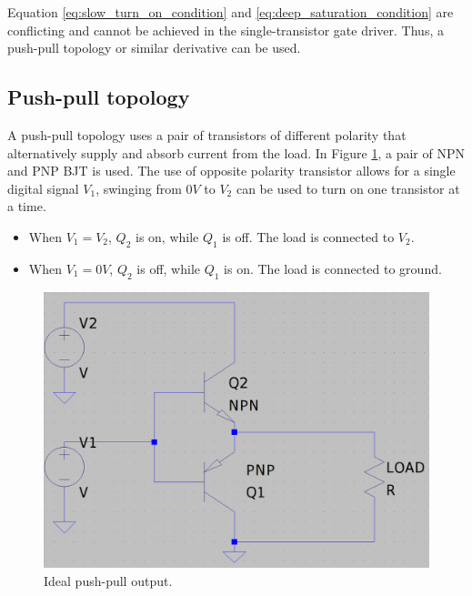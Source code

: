 \documentclass[../main.tex]{subfiles}
\begin{document}
    \justify
    Equation \eqref{eq:slow_turn_on_condition} and \eqref{eq:deep_saturation_condition} are conflicting and cannot be achieved in the single-transistor gate driver. Thus, a push-pull topology or similar derivative can be used.

    \pagebreak
    \subsection{Push-pull topology} \label{sec:proposed_push_pull}

    \justify
    A push-pull topology uses a pair of transistors of different polarity that alternatively supply and absorb current from the load. In Figure \ref{fig:ideal_totem_pole}, a pair of NPN and PNP BJT is used. The use of opposite polarity transistor allows for a single digital signal $V_1$, swinging from $0V$ to $V_2$ can be used to turn on one transistor at a time.

    \begin{itemize}
        \item When $V_1=V_2$, $Q_2$ is on, while $Q_1$ is off. The load is connected to $V_2$.
        \item When $V_1=0V$, $Q_2$ is off, while $Q_1$ is on. The load is connected to ground.
    \end{itemize}

    \begin{figure}[!h]
        \centerline{\includegraphics[scale=0.2]{media/ideal_totem_pole.png}}
        \caption{Ideal push-pull output.}
        \label{fig:ideal_totem_pole}
    \end{figure}
\end{document}
